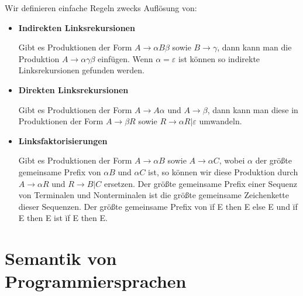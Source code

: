 Wir definieren einfache Regeln zwecks Auflösung von:
\begin{itemize}
\item \textbf{Indirekten Linksrekursionen}

Gibt es Produktionen der Form $A \to \alpha B \beta$ sowie $B \to \gamma$, dann kann man die Produktion
$A \to \alpha \gamma \beta$ einfügen. Wenn $\alpha=\varepsilon$ ist können so indirekte Linksrekursionen gefunden werden.
\item \textbf{Direkten Linksrekursionen}

Gibt es Produktionen der Form $A \to A \alpha$ und $A \to \beta$, dann kann man diese in Produktionen der Form $A \to \beta R$ sowie 
$R \to \alpha R | \varepsilon$ umwandeln.
\item \textbf{Linksfaktorisierungen}

Gibt es Produktionen der Form $A \to \alpha B$ sowie $A \to \alpha C$, wobei $\alpha$ der größte gemeinsame Prefix von $\alpha B$ und $\alpha C$ ist,
so können wir diese Produktion durch $A \to \alpha R$ und $R \to B | C$ ersetzen. Der größte gemeinsame Prefix einer Sequenz von Terminalen und Nonterminalen ist die größte
gemeinsame Zeichenkette dieser Sequenzen. Der größte gemeinsame Prefix von \u{if E then E else E} und \u{if E then E} ist \u{if E then E}.



\end{itemize}

\chapter{Semantik von Programmiersprachen}
